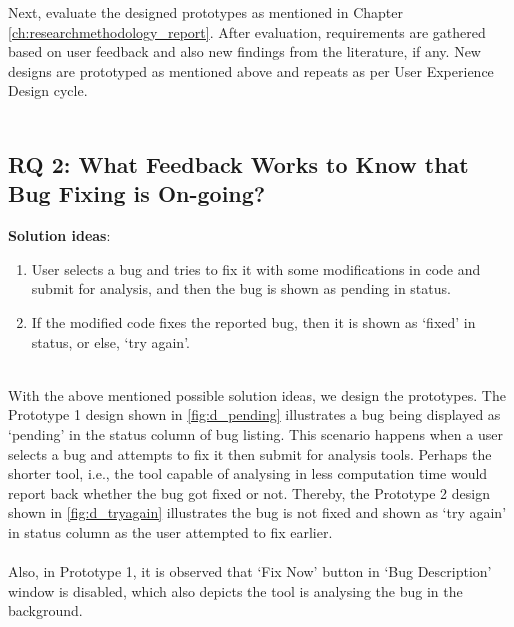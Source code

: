 Next, evaluate the designed prototypes as mentioned in Chapter \ref{ch:researchmethodology_report}. After evaluation, requirements are gathered based on user feedback and also new findings from the literature, if any. New designs are prototyped as mentioned above and repeats as per User Experience Design cycle. \\ \\

\subsection{RQ 2: What Feedback Works to Know that Bug Fixing is On-going?}
\hfill \break
\textbf{Solution ideas}: \\
\begin{enumerate}
\item  User selects a bug and tries to fix it with some modifications in code and submit for analysis, and then the bug is shown as pending in status.
\item  If the modified code fixes the reported bug, then it is shown as ‘fixed’ in status, or else, ‘try again’. \\ \\
\end{enumerate}

With the above mentioned possible solution ideas, we design the prototypes. The Prototype 1 design shown in \autoref{fig:d_pending} illustrates a bug being displayed as ‘pending’ in the status column of bug listing. This scenario happens when a user selects a bug and attempts to fix it then submit for analysis tools. Perhaps the shorter tool, i.e., the tool capable of analysing in less computation time would report back whether the bug got fixed or not. Thereby, the Prototype 2 design shown in \autoref{fig:d_tryagain} illustrates the bug is not fixed and shown as ‘try again’ in status column as the user attempted to fix earlier. \\ \\

Also, in Prototype 1, it is observed that ‘Fix Now’ button in ‘Bug Description’ window is disabled, which also depicts the tool is analysing the bug in the background. \\

\clearpage 

